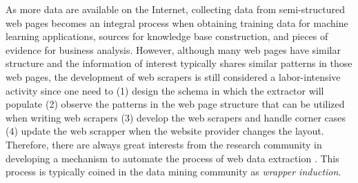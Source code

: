\documentclass[12pt,a4paper]{article}
\begin{document}
\begin{description}
    As more data are available on the Internet, collecting data from semi-structured web pages becomes an integral process when obtaining training data for machine learning applications, sources for knowledge base construction, and pieces of evidence for business analysis. However, although many web pages have similar structure and the information of interest typically shares similar patterns in those web pages, the development of web scrapers is still considered a labor-intensive activity since one need to (1) design the schema in which the extractor will populate (2) observe the patterns in the web page structure that can be utilized when writing web scrapers (3) develop the web scrapers and handle corner cases (4) update the web scrapper when the website provider changes the layout. Therefore, there are always great interests from the research community in developing a mechanism to automate the process of web data extraction \cite{dalvi2011automatic}. This process is typically coined in the data mining community as \textit{wrapper induction}.
    

\end{description}
\end{document}
